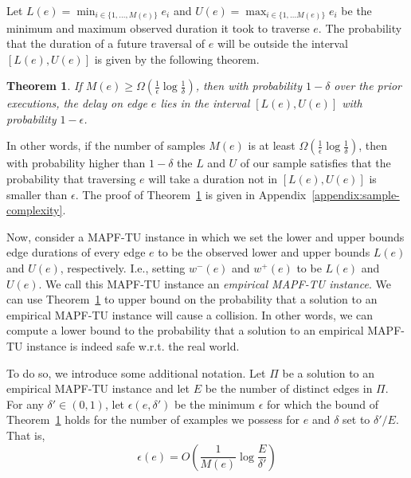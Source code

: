 \documentclass[jair,twoside,11pt,theapa]{article}
\newcommand{\mapftu}{MAPF-TU\xspace}
\newtheorem{theorem}{Theorem}
\begin{document}
Let $L(e)=\min_{i\in\{1,\ldots,M(e)\}} e_i$ and $U(e)=\max_{i\in\{1,\ldots M(e)\}} e_i$ be the minimum and maximum observed duration it took to traverse $e$. 
The probability that the duration of a future traversal of $e$ will be outside the interval
$[L(e), U(e)]$ is given by the following theorem. 
\begin{theorem}
If $M(e)\geq \Omega(\frac{1}{\epsilon}\log\frac{1}{\delta})$, then with probability $1-\delta$ over the prior executions, the delay on edge $e$ lies in the interval $[L(e),U(e)]$ with probability $1-\epsilon$.
\label{simple-bound-thm}
\end{theorem}
In other words, if the number of samples $M(e)$ is at least $\Omega(\frac{1}{\epsilon}\log\frac{1}{\delta})$,  
then with probability higher than $1-\delta$ the $L$ and $U$ of our sample satisfies that 
the probability that traversing $e$ will take a duration not in $[L(e),U(e)]$ is smaller than $\epsilon$. 
The proof of Theorem~\ref{simple-bound-thm} is given in Appendix~\ref{appendix:sample-complexity}. 

Now, consider a \mapftu instance in which we set the lower and upper bounds edge durations of every edge $e$ to be the observed lower and upper bounds $L(e)$ and $U(e)$, respectively. 
I.e., setting $w^{-}(e)$ and $w^{+}(e)$ to be $L(e)$ and $U(e)$. 
We call this \mapftu instance an \emph{empirical \mapftu instance}. 
We can use Theorem~\ref{simple-bound-thm} to upper bound on the probability that 
a solution to an empirical \mapftu instance will cause a collision. 
In other words, we can compute a lower bound to the probability that a solution to an empirical \mapftu instance is indeed safe w.r.t. the real world. 


To do so, we introduce some additional notation. 
Let $\Pi$ be a solution to an empirical \mapftu instance 
and let $E$ be the number of distinct edges in $\Pi$. 
For any $\delta'\in (0,1)$, let $\epsilon(e,\delta')$ be the minimum $\epsilon$ for which the bound of Theorem~\ref{simple-bound-thm} holds for the number of examples we possess for $e$ and $\delta$ set to $\delta'/E$. 
That is, 
\begin{equation}
    \epsilon(e)=O\left(\frac{1}{M(e)}\log\frac{E}{\delta'}\right)
\end{equation}

\end{document}
